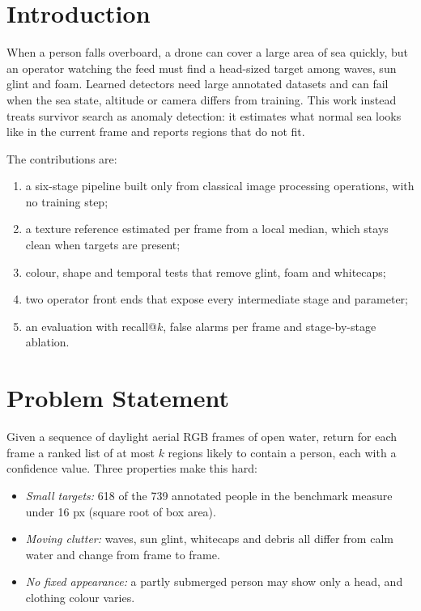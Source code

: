 \documentclass[conference,a4paper]{IEEEtran}
\begin{document}
\section{Introduction}

When a person falls overboard, a drone can cover a large area of sea quickly, but an operator watching the feed must find a head-sized target among waves, sun glint and foam. Learned detectors need large annotated datasets and can fail when the sea state, altitude or camera differs from training. This work instead treats survivor search as anomaly detection: it estimates what normal sea looks like in the current frame and reports regions that do not fit.

The contributions are:
\begin{enumerate}
  \item a six-stage pipeline built only from classical image processing operations, with no training step;
  \item a texture reference estimated per frame from a local median, which stays clean when targets are present;
  \item colour, shape and temporal tests that remove glint, foam and whitecaps;
  \item two operator front ends that expose every intermediate stage and parameter;
  \item an evaluation with recall@$k$, false alarms per frame and stage-by-stage ablation.
\end{enumerate}

\section{Problem Statement}

Given a sequence of daylight aerial RGB frames of open water, return for each frame a ranked list of at most $k$ regions likely to contain a person, each with a confidence value. Three properties make this hard:
\begin{itemize}
  \item \textit{Small targets:} 618 of the 739 annotated people in the benchmark measure under 16 px (square root of box area).
  \item \textit{Moving clutter:} waves, sun glint, whitecaps and debris all differ from calm water and change from frame to frame.
  \item \textit{No fixed appearance:} a partly submerged person may show only a head, and clothing colour varies.
\end{itemize}
\end{document}
